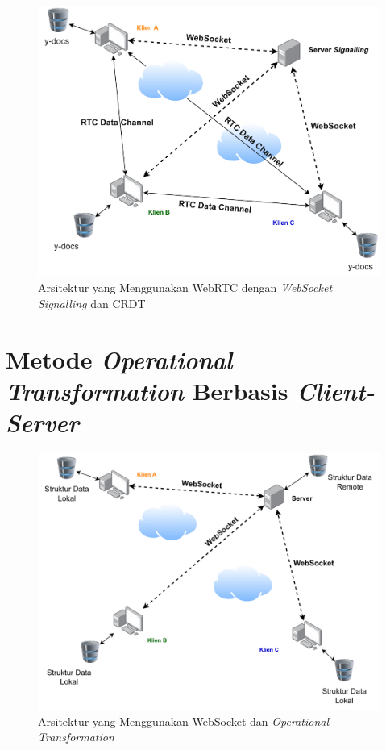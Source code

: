 \begin{figure}
    \centering
    \includegraphics[scale=0.6]{assets/skripsi/Arsitektur_WebRTC_CRDT}
    \caption{Arsitektur yang Menggunakan WebRTC dengan \textit{WebSocket Signalling} dan CRDT}
\end{figure}

\section{Metode \textit{Operational Transformation} Berbasis \textit{Client-Server}}

\begin{figure}
    \centering
    \includegraphics[scale=0.42]{assets/skripsi/Arsitektur_WebSocket_OT}
    \caption{Arsitektur yang Menggunakan WebSocket dan \textit{Operational Transformation}}
    \label{fig:websocket_ot}
\end{figure}

